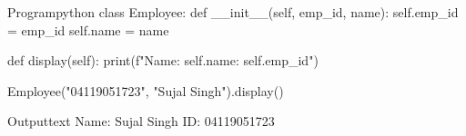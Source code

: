 \documentclass[11pt]{ipu-python}
\begin{document}
    \newpage
    \begin{code}
        {Program}{python}
class Employee:
    def __init__(self, emp_id, name):
        self.emp_id = emp_id
        self.name = name

    def display(self):
        print(f"Name: {self.name}\nID: {self.emp_id}")


Employee("04119051723", "Sujal Singh").display()
    \end{code}
    \begin{code}
        {Output}{text}
Name: Sujal Singh
ID: 04119051723
    \end{code}
\end{document}
